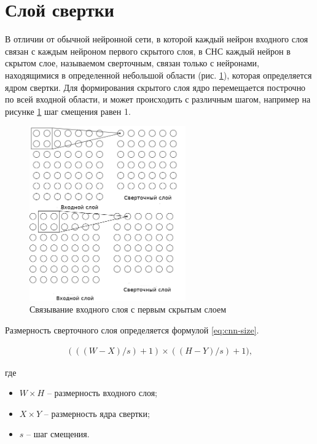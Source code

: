 \section*{Слой свертки}

В отличии от обычной нейронной сети, в которой каждый нейрон входного слоя связан с каждым нейроном первого скрытого слоя, в СНС каждый нейрон в скрытом слое, называемом сверточным, связан только с нейронами, находящимися в определенной небольшой области (рис. \ref{anal:CNN-first}), которая определяется ядром свертки. Для формирования скрытого слоя ядро перемещается построчно по всей входной области, и может происходить с различным шагом, например на рисунке \ref{anal:CNN-first} шаг смещения равен 1.

\begin{figure}
	\centering
	\includegraphics[width=0.6\textwidth]{inc/img/cnn-first.png}
	\caption{Связывание входного слоя с первым скрытым слоем}
	\label{anal:CNN-first}
\end{figure}

Размерность сверточного слоя определяется формулой \ref{eq:cnn-size}.

\begin{eqnarray}\label{eq:cnn-size}
(((W - X) / s) + 1) \times ((H - Y) / s) + 1), 
\end{eqnarray}

где

\begin{itemize}
	\item $W \times H$ -- размерность входного слоя;
	\item $X \times Y$ -- размерность ядра свертки;
	\item $s$ -- шаг смещения.
\end{itemize}

